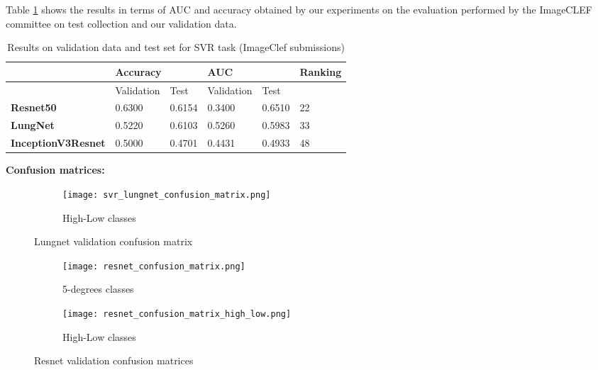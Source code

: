 Table \ref{rsrs} shows the results in terms of AUC and accuracy obtained by our experiments on the evaluation performed by the ImageCLEF committee on test collection and our validation data.
\begin{table}
\center
\begin{tabular}{|l|l|l|l|l|l|l|}
\hline
          & \multicolumn{2}{l|}{Accuracy} & \multicolumn{2}{l|}{AUC} & \multicolumn{2}{l|}{Ranking}                                         \\ \hline
          & Validation      & Test        & Validation    & Test     & \multicolumn{2}{l|}{} \\ \hline
\textbf{Resnet50}  & 0.6300            & 0.6154      & 0.3400          & 0.6510   & \multicolumn{2}{l|}{22}                                              \\ \hline
\textbf{LungNet}   & 0.5220           & 0.6103      & 0.5260         & 0.5983   & \multicolumn{2}{l|}{33}                                              \\ \hline
\textbf{InceptionV3Resnet} & 0.5000        & 0.4701      & 0.4431         & 0.4933   & \multicolumn{2}{l|}{ 48} \\ \hline

\end{tabular}
\caption{Results on validation data and test set for SVR task (ImageClef submissions)}
\label{rsrs}
\end{table}
\newpage
\textbf{Confusion matrices:}
\begin{figure}[h!]
\centering
  \begin{subfigure}[b]{0.4\linewidth}
    \texttt{[image: svr\_lungnet\_confusion\_matrix.png]}
    \caption{High-Low classes}
  \end{subfigure}
\label{lungnet_conf_mat}
\caption{Lungnet validation confusion matrix }
\end{figure}

\begin{figure}[h!]
\centering
  \begin{subfigure}[b]{0.4\linewidth}
    \texttt{[image: resnet\_confusion\_matrix.png]}
    \caption{5-degrees classes}
  \end{subfigure}
  \begin{subfigure}[b]{0.4\linewidth}
    \texttt{[image: resnet\_confusion\_matrix\_high\_low.png]}
    \caption{High-Low classes}
  \end{subfigure}
\label{resnet_conf_mat}
\caption{Resnet validation confusion matrices }
\end{figure}

